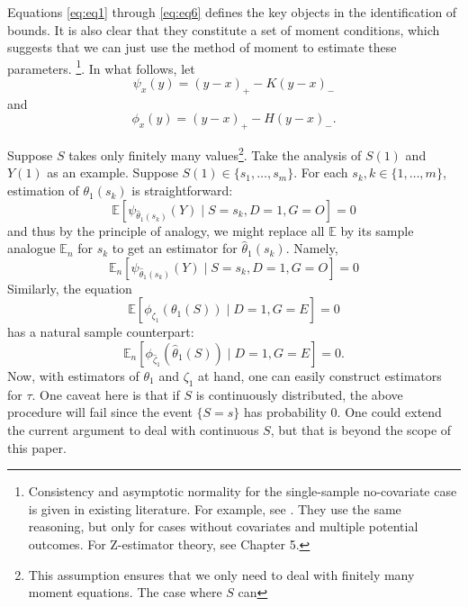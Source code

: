 \documentclass[12pt]{article}
\newcommand{\Ep}{\mathbb{E}}
\begin{document}
	Equations \ref{eq:eq1} through \ref{eq:eq6} defines the key objects in the identification of bounds. It is also clear that they constitute a set of moment conditions, which suggests that we can just use the method of moment to estimate these parameters.
	\footnote{Consistency and asymptotic normality for the single-sample no-covariate case is given in existing literature. For example, see \textcite{yadlowsky2018bounds}. They use the same reasoning, but only for cases without covariates and multiple potential outcomes. For Z-estimator theory, see \textcite{van2000asymptotic} Chapter 5.}. In what follows, let $$\psi_x(y) = (y - x)_+ - K (y - x)_-$$ and $$\phi_x(y) = (y - x)_+ - H (y - x)_-.$$
	
	Suppose $S$ takes only finitely many values\footnote{This assumption ensures that we only need to deal with finitely many moment equations. The case where $S$ can }. Take the analysis of $S(1)$ and $Y(1)$ as an example. Suppose $S(1) \in \{s_1,\ldots, s_m\}$. For each $s_k, k\in\{1,\ldots,m\}$, estimation of $\theta_1(s_k)$ is straightforward:
	$$
	\mathbb{E}\left[\psi_{\hat{\theta}_1(s_k)}(Y) \mid S = s_k, D=1, G = O\right] = 0
	$$
	and thus by the principle of analogy, we might replace all $\Ep$ by its sample analogue $\Ep_n$ for $s_k$ to get an estimator for $\hat{\theta}_1(s_k)$. Namely, 
	$$
    \mathbb{E}_n\left[\psi_{\hat{\theta}_1(s_k)}(Y) \mid S = s_k, D=1, G=O\right] = 0
	$$
	Similarly, the equation 
	\begin{equation*}
	\mathbb{E}\left[\phi_{{\zeta}_1}(\theta_1(S)) \mid D=1,G=E\right] = 0
	\end{equation*} 
	has a natural sample counterpart:
	\begin{equation*}
	\mathbb{E}_n\left[\phi_{\hat{\zeta}_1}(\hat{\theta}_1(S)) \mid D=1, G=E\right] = 0.
	\end{equation*}
	Now, with estimators of $\theta_1$ and $\zeta_1$ at hand, one can easily construct estimators for $\tau$. One caveat here is that if $S$ is continuously distributed, the above procedure will fail since the event $\{S = s\}$ has probability 0. One could extend the current argument to deal with continuous $S$, but that is beyond the scope of this paper.
	
\end{document}
